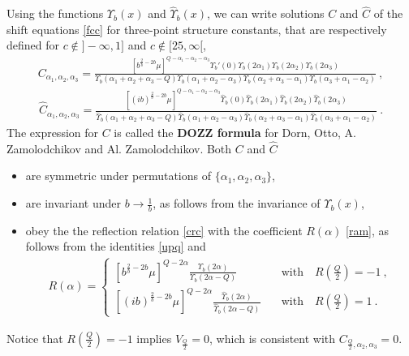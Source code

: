 \documentclass[12pt, a4paper, notitlepage, twoside]{report}
\numberwithin{equation}{section}
\theoremstyle{break}
\begin{document}
Using the functions $\Upsilon_b(x)$ and $\hat\Upsilon_b(x)$, we can write solutions $C$ and $\hat C$ of the shift equations \eqref{fcc} for three-point structure constants, that are respectively defined for $c\notin ]-\infty, 1]$ and $c\notin [25,\infty[$,
\begin{align}
 \boxed{C_{\alpha_1,\alpha_2,\alpha_3} =  \frac{\left[b^{\frac{2}{b}-2b}\mu\right]^{Q-\alpha_1-\alpha_2-\alpha_3}\Upsilon_b'(0) \Upsilon_b(2\alpha_1) \Upsilon_b(2\alpha_2) \Upsilon_b(2\alpha_3)}{\Upsilon_b(\alpha_1+\alpha_2+\alpha_3-Q) \Upsilon_b(\alpha_1+\alpha_2-\alpha_3)\Upsilon_b(\alpha_2+\alpha_3-\alpha_1)\Upsilon_b(\alpha_3+\alpha_1-\alpha_2)}} \ ,
\label{caaa}
\end{align}
\begin{align}
\boxed{\hat{C}_{\alpha_1,\alpha_2,\alpha_3} =  \frac{\left[(ib)^{\frac{2}{b}-2b}\mu\right]^{Q-\alpha_1-\alpha_2-\alpha_3}\hat{\Upsilon}_b(0) \hat{\Upsilon}_b(2\alpha_1) \hat{\Upsilon}_b(2\alpha_2) \hat{\Upsilon}_b(2\alpha_3)}{\hat{\Upsilon}_b(\alpha_1+\alpha_2+\alpha_3-Q) \hat{\Upsilon}_b(\alpha_1+\alpha_2-\alpha_3)\hat{\Upsilon}_b(\alpha_2+\alpha_3-\alpha_1)\hat{\Upsilon}_b(\alpha_3+\alpha_1-\alpha_2)}} \ .
\label{hc}
\end{align}
The expression for $C$ is called the \textbf{\boldmath DOZZ formula} for Dorn, Otto, A.
Zamolodchikov and Al.
Zamolodchikov. 
Both $C$ and $\hat C$
\begin{itemize}
 \item are symmetric under permutations of $\{\alpha_1,\alpha_2,\alpha_3\}$, 
\item are invariant under $b\to \frac{1}{b}$, as follows from the invariance of $\Upsilon_b(x)$,
\item obey the the reflection relation \eqref{crc} with the coefficient $R(\alpha)$ \eqref{ram}, as follows from the identities \eqref{upq} and 
\begin{align}
 R(\alpha)
=
\left\{\begin{array}{ll}
\left[b^{\frac{2}{b}-2b}\mu\right]^{Q-2\alpha}\frac{\Upsilon_b(2\alpha)}{\Upsilon_b(2\alpha-Q)}
& \quad \text{with} \quad R(\tfrac{Q}{2}) = -1 \ ,
\\
\left[(ib)^{\frac{2}{b}-2b}\mu\right]^{Q-2\alpha}\frac{\hat{\Upsilon}_b(2\alpha)}{\hat{\Upsilon}_b(2\alpha-Q)}
& \quad \text{with} \quad R(\tfrac{Q}{2}) = 1 \ .
\end{array}\right.
\end{align}
\end{itemize}
Notice that $R(\frac{Q}{2})=-1$ implies $V_\frac{Q}{2}=0$, which is consistent with $C_{\frac{Q}{2},\alpha_2,\alpha_3}=0$.
\end{document}
